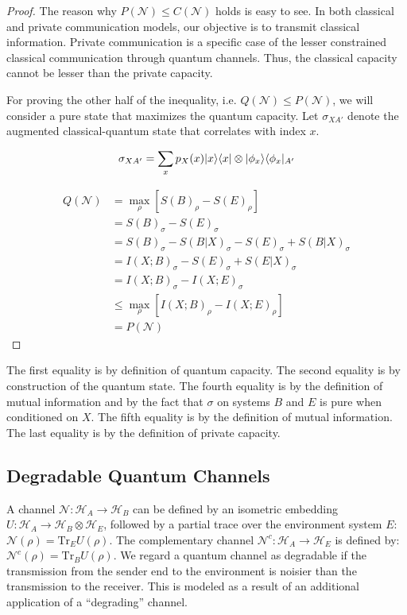 \begin{proof}
The reason why $P(\mathcal{N}) \leq C(\mathcal{N})$ holds is easy to see. In both classical and private communication models, our objective is to transmit classical information. Private communication is a specific case of the lesser constrained classical communication through quantum channels. Thus, the classical capacity cannot be lesser than the private capacity.

For proving the other half of the inequality, i.e. $Q(\mathcal{N}) \leq P(\mathcal{N})$, we will consider a pure state that maximizes the quantum capacity. Let $\sigma_{XA'}$ denote the augmented classical-quantum state that correlates with index $x$.

$$\sigma_{XA'} = \sum_{x} p_X(x) \lvert x\rangle\langle x\rvert \otimes \lvert\phi_x\rangle\langle\phi_x\rvert_{A'}$$

\begin{align*}
Q(\mathcal{N}) &= \max_{\rho} \left[ S(B)_{\rho} - S(E)_{\rho} \right] \\
&= S(B)_{\sigma} - S(E)_{\sigma} \\
&= S(B)_{\sigma} - S(B|X)_{\sigma} - S(E)_{\sigma} + S(B|X)_{\sigma} \\
&= I(X;B)_{\sigma} - S(E)_{\sigma} + S(E|X)_{\sigma} \\
&= I(X;B)_{\sigma} - I(X;E)_{\sigma} \\
&\leq \max_{\rho} \left[ I(X;B)_{\rho} - I(X;E)_{\rho} \right] \\
&= P(\mathcal{N})
\end{align*}
\end{proof}

The first equality is by definition of quantum capacity. The second equality is by construction of the quantum state. The fourth equality is by the definition of mutual information and by the fact that $\sigma$ on systems $B$ and $E$ is pure when conditioned on $X$. The fifth equality is by the definition of mutual information. The last equality is by the definition of private capacity.

\subsection{Degradable Quantum Channels}

A channel $\mathcal{N}: \mathcal{H}_A \rightarrow \mathcal{H}_B$ can be defined by an isometric embedding $U: \mathcal{H}_A \rightarrow \mathcal{H}_B \otimes \mathcal{H}_E$, followed by a partial trace over the environment system $E$: $\mathcal{N}(\rho) = \mathrm{Tr}_E U(\rho)$. The complementary channel $\mathcal{N}^c: \mathcal{H}_A \rightarrow \mathcal{H}_E$ is defined by: $\mathcal{N}^c(\rho) = \mathrm{Tr}_B U(\rho)$. We regard a quantum channel as degradable if the transmission from the sender end to the environment is noisier than the transmission to the receiver. This is modeled as a result of an additional application of a ``degrading'' channel.

